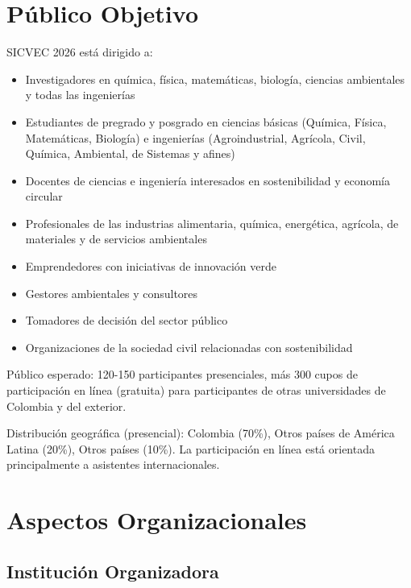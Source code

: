 \documentclass[12pt,a4paper]{article}
\begin{document}
\section{Público Objetivo}

SICVEC 2026 está dirigido a:

\begin{itemize}[label={\textcolor{verdeosc}{\textbullet}}]
  \item Investigadores en química, física, matemáticas, biología, ciencias ambientales y todas las ingenierías
  \item Estudiantes de pregrado y posgrado en ciencias básicas (Química, Física, Matemáticas, Biología) e ingenierías (Agroindustrial, Agrícola, Civil, Química, Ambiental, de Sistemas y afines)
  \item Docentes de ciencias e ingeniería interesados en sostenibilidad y economía circular
  \item Profesionales de las industrias alimentaria, química, energética, agrícola, de materiales y de servicios ambientales
  \item Emprendedores con iniciativas de innovación verde
  \item Gestores ambientales y consultores
  \item Tomadores de decisión del sector público
  \item Organizaciones de la sociedad civil relacionadas con sostenibilidad
\end{itemize}

Público esperado: 120-150 participantes presenciales, más 300 cupos de participación en línea (gratuita) para participantes de otras universidades de Colombia y del exterior.

Distribución geográfica (presencial): Colombia (70\%), Otros países de América Latina (20\%), Otros países (10\%). La participación en línea está orientada principalmente a asistentes internacionales.

\section{Aspectos Organizacionales}

\subsection{Institución Organizadora}
\end{document}
